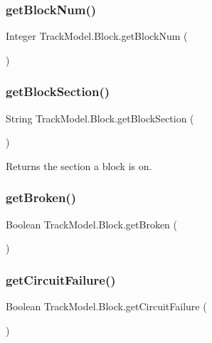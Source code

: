 \subsubsection{\texorpdfstring{get\+Block\+Num()}{getBlockNum()}}
{\footnotesize\ttfamily Integer Track\+Model.\+Block.\+get\+Block\+Num (\begin{DoxyParamCaption}{ }\end{DoxyParamCaption})}

\mbox{\label{classTrackModel_1_1Block_a2733e908ed59561bcb58ada3dd6045ab}} 
\subsubsection{\texorpdfstring{get\+Block\+Section()}{getBlockSection()}}
{\footnotesize\ttfamily String Track\+Model.\+Block.\+get\+Block\+Section (\begin{DoxyParamCaption}{ }\end{DoxyParamCaption})}



Returns the section a block is on. 

\mbox{\label{classTrackModel_1_1Block_aa1ac9505793be31e681ef21dba05b85a}} 
\subsubsection{\texorpdfstring{get\+Broken()}{getBroken()}}
{\footnotesize\ttfamily Boolean Track\+Model.\+Block.\+get\+Broken (\begin{DoxyParamCaption}{ }\end{DoxyParamCaption})}

\mbox{\label{classTrackModel_1_1Block_a357ab105c5108e9656d10954fab85426}} 
\subsubsection{\texorpdfstring{get\+Circuit\+Failure()}{getCircuitFailure()}}
{\footnotesize\ttfamily Boolean Track\+Model.\+Block.\+get\+Circuit\+Failure (\begin{DoxyParamCaption}{ }\end{DoxyParamCaption})}


